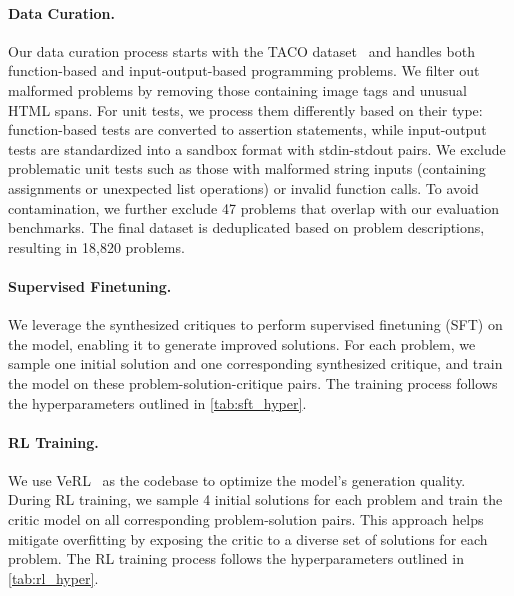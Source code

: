 \paragraph{Data Curation.} Our data curation process starts with the TACO dataset~\cite{li2023taco} and handles both function-based and input-output-based programming problems. We filter out malformed problems by removing those containing image tags and unusual HTML spans. For unit tests, we process them differently based on their type: function-based tests are converted to assertion statements, while input-output tests are standardized into a sandbox format with stdin-stdout pairs. We exclude problematic unit tests such as those with malformed string inputs (containing assignments or unexpected list operations) or invalid function calls.
To avoid contamination, we further exclude 47 problems that overlap with our evaluation benchmarks.
The final dataset is deduplicated based on problem descriptions, resulting in 18,820 problems.

\paragraph{Supervised Finetuning.} 
We leverage the synthesized critiques to perform supervised finetuning (SFT) on the model, enabling it to generate improved solutions. For each problem, we sample one initial solution and one corresponding synthesized critique, and train the model on these problem-solution-critique pairs. The training process follows the hyperparameters outlined in \cref{tab:sft_hyper}.

\paragraph{RL Training.}
We use VeRL~\cite{sheng2024hybridflow} as the codebase to optimize the model's generation quality. During RL training, we sample 4 initial solutions for each problem and train the critic model on all corresponding problem-solution pairs. This approach helps mitigate overfitting by exposing the critic to a diverse set of solutions for each problem. The RL training process follows the hyperparameters outlined in \cref{tab:rl_hyper}.


